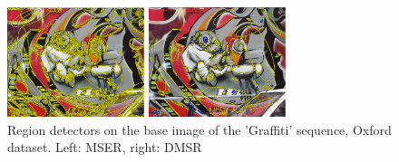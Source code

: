 \documentclass{article}
\begin{document}
\begin{figure}[htb]

\begin{minipage}[b]{.49\linewidth}
  \centering
  \centerline{\includegraphics[width=4.0cm]{./Figs/mserGraffiti1}}
\end{minipage}
\hfill
\begin{minipage}[b]{0.49\linewidth}
  \centering
  \centerline{\includegraphics[width=4.0cm]{./Figs/dmsrGraffiti1}}
\end{minipage}
\vspace{-0.25cm}
\caption{Region detectors on the base image of the 'Graffiti' sequence, Oxford dataset. Left: MSER, right: DMSR}
\label{fig:det_graffiti}
%
\end{figure}
\end{document}
